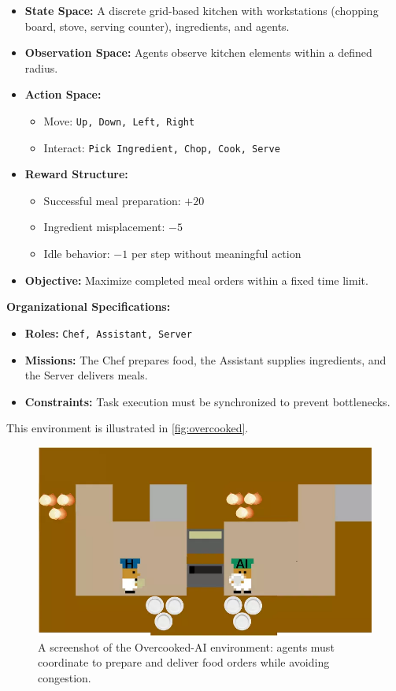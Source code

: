 \documentclass[pdflatex,sn-mathphys-num]{sn-jnl}%
\theoremstyle{thmstyleone}%
\theoremstyle{thmstyletwo}%
\theoremstyle{thmstylethree}%
\begin{document}
\begin{itemize}
    \item \textbf{State Space:} A discrete grid-based kitchen with workstations (chopping board, stove, serving counter), ingredients, and agents.
    \item \textbf{Observation Space:} Agents observe kitchen elements within a defined radius.
    \item \textbf{Action Space:} 
    \begin{itemize}
        \item Move: \texttt{Up, Down, Left, Right}
        \item Interact: \texttt{Pick Ingredient, Chop, Cook, Serve}
    \end{itemize}
    \item \textbf{Reward Structure:}
    \begin{itemize}
        \item Successful meal preparation: $+20$
        \item Ingredient misplacement: $-5$
        \item Idle behavior: $-1$ per step without meaningful action
    \end{itemize}
    \item \textbf{Objective:} Maximize completed meal orders within a fixed time limit.
\end{itemize}

\textbf{Organizational Specifications:} 
\begin{itemize}
    \item \textbf{Roles:} \texttt{Chef, Assistant, Server}
    \item \textbf{Missions:} The Chef prepares food, the Assistant supplies ingredients, and the Server delivers meals.
    \item \textbf{Constraints:} Task execution must be synchronized to prevent bottlenecks.
\end{itemize}

This environment is illustrated in \autoref{fig:overcooked}.

\begin{figure}[h!]
    \centering
    \includegraphics[width=0.7\linewidth]{figures/overcooked.png}
    \caption{A screenshot of the Overcooked-AI environment: agents must coordinate to prepare and deliver food orders while avoiding congestion.}
    \label{fig:overcooked}
\end{figure}
\end{document}
